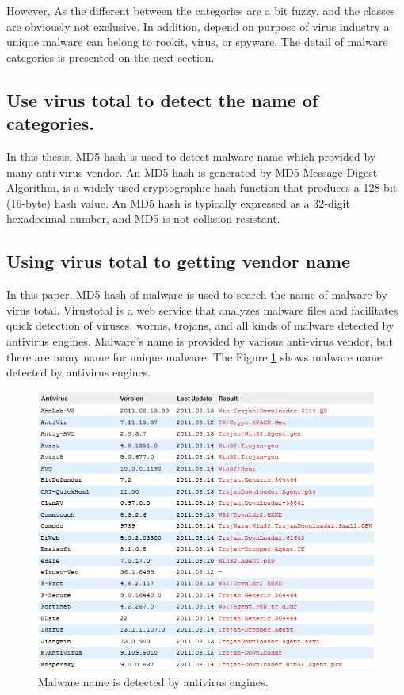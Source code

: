 However, As the different between the categories are a bit fuzzy, and the classes are obviously not exclusive. In addition, depend on purpose of virus industry a unique malware can belong to rookit, virus, or spyware. The detail of malware categories is presented on the next section. 
\subsection{Use virus total to detect the name of categories.}

In this thesis, MD5 hash is used to detect malware name which provided by many anti-virus vendor. An MD5 hash is generated by MD5 Message-Digest Algorithm, is a widely used cryptographic hash function that produces a 128-bit (16-byte) hash value. An MD5 hash is typically expressed as a 32-digit hexadecimal number, and MD5 is not collision resistant\cite{wiki1}.

\subsection{Using virus total to getting vendor name}
In this paper, MD5 hash of malware is used to search the name of malware by virus total. Virustotal is a web service that analyzes malware files and facilitates quick detection of viruses, worms, trojans, and all kinds of malware detected by antivirus engines. Malware's name is provided by various anti-virus vendor, but there are many name for unique malware. The Figure \ref{fig:virustotal_listname} shows malware name detected by antivirus engines. 
\begin{figure}[h!]
\centering
\includegraphics[width=1.0\textwidth]{graph/virustotal_listname.png}
\caption{Malware name is detected by antivirus engines.}
\label{fig:virustotal_listname}
\end{figure}
